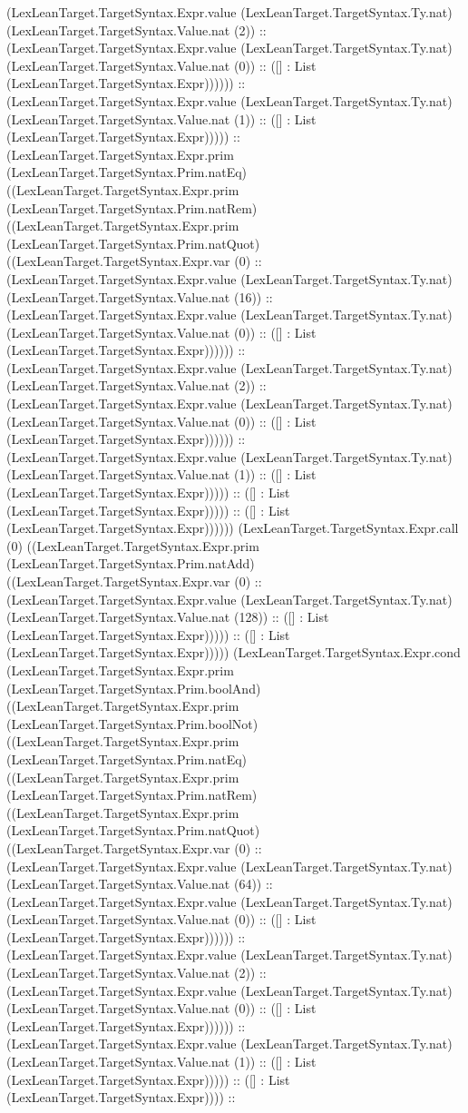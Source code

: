 \documentclass[11pt]{article}
\begin{document}
(LexLeanTarget.TargetSyntax.Expr.value (LexLeanTarget.TargetSyntax.Ty.nat) (LexLeanTarget.TargetSyntax.Value.nat (2)) :: (LexLeanTarget.TargetSyntax.Expr.value (LexLeanTarget.TargetSyntax.Ty.nat) (LexLeanTarget.TargetSyntax.Value.nat (0)) :: ([] : List (LexLeanTarget.TargetSyntax.Expr)))))) :: (LexLeanTarget.TargetSyntax.Expr.value (LexLeanTarget.TargetSyntax.Ty.nat) (LexLeanTarget.TargetSyntax.Value.nat (1)) :: ([] : List (LexLeanTarget.TargetSyntax.Expr))))) :: (LexLeanTarget.TargetSyntax.Expr.prim (LexLeanTarget.TargetSyntax.Prim.natEq) ((LexLeanTarget.TargetSyntax.Expr.prim (LexLeanTarget.TargetSyntax.Prim.natRem) ((LexLeanTarget.TargetSyntax.Expr.prim (LexLeanTarget.TargetSyntax.Prim.natQuot) ((LexLeanTarget.TargetSyntax.Expr.var (0) :: (LexLeanTarget.TargetSyntax.Expr.value (LexLeanTarget.TargetSyntax.Ty.nat) (LexLeanTarget.TargetSyntax.Value.nat (16)) :: (LexLeanTarget.TargetSyntax.Expr.value (LexLeanTarget.TargetSyntax.Ty.nat) (LexLeanTarget.TargetSyntax.Value.nat (0)) :: ([] : List (LexLeanTarget.TargetSyntax.Expr)))))) :: (LexLeanTarget.TargetSyntax.Expr.value (LexLeanTarget.TargetSyntax.Ty.nat) (LexLeanTarget.TargetSyntax.Value.nat (2)) :: (LexLeanTarget.TargetSyntax.Expr.value (LexLeanTarget.TargetSyntax.Ty.nat) (LexLeanTarget.TargetSyntax.Value.nat (0)) :: ([] : List (LexLeanTarget.TargetSyntax.Expr)))))) :: (LexLeanTarget.TargetSyntax.Expr.value (LexLeanTarget.TargetSyntax.Ty.nat) (LexLeanTarget.TargetSyntax.Value.nat (1)) :: ([] : List (LexLeanTarget.TargetSyntax.Expr))))) :: ([] : List (LexLeanTarget.TargetSyntax.Expr))))) :: ([] : List (LexLeanTarget.TargetSyntax.Expr)))))) (LexLeanTarget.TargetSyntax.Expr.call (0) ((LexLeanTarget.TargetSyntax.Expr.prim (LexLeanTarget.TargetSyntax.Prim.natAdd) ((LexLeanTarget.TargetSyntax.Expr.var (0) :: (LexLeanTarget.TargetSyntax.Expr.value (LexLeanTarget.TargetSyntax.Ty.nat) (LexLeanTarget.TargetSyntax.Value.nat (128)) :: ([] : List (LexLeanTarget.TargetSyntax.Expr))))) :: ([] : List (LexLeanTarget.TargetSyntax.Expr))))) (LexLeanTarget.TargetSyntax.Expr.cond (LexLeanTarget.TargetSyntax.Expr.prim (LexLeanTarget.TargetSyntax.Prim.boolAnd) ((LexLeanTarget.TargetSyntax.Expr.prim (LexLeanTarget.TargetSyntax.Prim.boolNot) ((LexLeanTarget.TargetSyntax.Expr.prim (LexLeanTarget.TargetSyntax.Prim.natEq) ((LexLeanTarget.TargetSyntax.Expr.prim (LexLeanTarget.TargetSyntax.Prim.natRem) ((LexLeanTarget.TargetSyntax.Expr.prim (LexLeanTarget.TargetSyntax.Prim.natQuot) ((LexLeanTarget.TargetSyntax.Expr.var (0) :: (LexLeanTarget.TargetSyntax.Expr.value (LexLeanTarget.TargetSyntax.Ty.nat) (LexLeanTarget.TargetSyntax.Value.nat (64)) :: (LexLeanTarget.TargetSyntax.Expr.value (LexLeanTarget.TargetSyntax.Ty.nat) (LexLeanTarget.TargetSyntax.Value.nat (0)) :: ([] : List (LexLeanTarget.TargetSyntax.Expr)))))) :: (LexLeanTarget.TargetSyntax.Expr.value (LexLeanTarget.TargetSyntax.Ty.nat) (LexLeanTarget.TargetSyntax.Value.nat (2)) :: (LexLeanTarget.TargetSyntax.Expr.value (LexLeanTarget.TargetSyntax.Ty.nat) (LexLeanTarget.TargetSyntax.Value.nat (0)) :: ([] : List (LexLeanTarget.TargetSyntax.Expr)))))) :: (LexLeanTarget.TargetSyntax.Expr.value (LexLeanTarget.TargetSyntax.Ty.nat) (LexLeanTarget.TargetSyntax.Value.nat (1)) :: ([] : List (LexLeanTarget.TargetSyntax.Expr))))) :: ([] : List (LexLeanTarget.TargetSyntax.Expr)))) :: 
\end{document}
